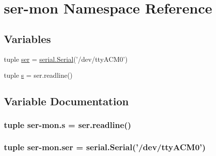 \hypertarget{namespaceser-mon}{\section{ser-\/mon Namespace Reference}
\label{namespaceser-mon}
}
\subsection*{Variables}
\begin{DoxyCompactItemize}
\item 
tuple \hyperlink{namespaceser-mon_a172fe4d911910417504386161b9d1891}{ser} = \hyperlink{HardwareSerial_8h_a7b8c4a195c58f9eb8750e94955c5aa4b}{serial.\-Serial}('/dev/tty\-A\-C\-M0')
\item 
tuple \hyperlink{namespaceser-mon_a37e0cdc510e97e5ed77ef9606c5659f0}{s} = ser.\-readline()
\end{DoxyCompactItemize}


\subsection{Variable Documentation}
\hypertarget{namespaceser-mon_a37e0cdc510e97e5ed77ef9606c5659f0}{
\subsubsection[{s}]{\setlength{\rightskip}{0pt plus 5cm}tuple {\bf ser}-\/mon.\-s = ser.\-readline()}}\label{namespaceser-mon_a37e0cdc510e97e5ed77ef9606c5659f0}
\hypertarget{namespaceser-mon_a172fe4d911910417504386161b9d1891}{
\subsubsection[{ser}]{\setlength{\rightskip}{0pt plus 5cm}tuple ser-\/mon.\-ser = {\bf serial.\-Serial}('/dev/tty\-A\-C\-M0')}}\label{namespaceser-mon_a172fe4d911910417504386161b9d1891}
